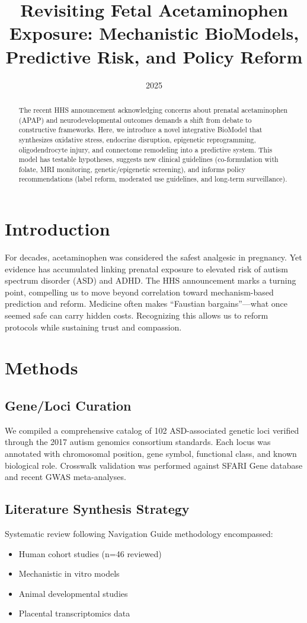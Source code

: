 \documentclass[12pt]{article}
\title{Revisiting Fetal Acetaminophen Exposure: Mechanistic BioModels, Predictive Risk, and Policy Reform}
\author{}
\date{2025}
\begin{document}
\maketitle

\begin{abstract}
The recent HHS announcement acknowledging concerns about prenatal acetaminophen (APAP) and neurodevelopmental outcomes demands a shift from debate to constructive frameworks. Here, we introduce a novel integrative BioModel that synthesizes oxidative stress, endocrine disruption, epigenetic reprogramming, oligodendrocyte injury, and connectome remodeling into a predictive system. This model has testable hypotheses, suggests new clinical guidelines (co-formulation with folate, MRI monitoring, genetic/epigenetic screening), and informs policy recommendations (label reform, moderated use guidelines, and long-term surveillance).
\end{abstract}

\section{Introduction}
For decades, acetaminophen was considered the safest analgesic in pregnancy. Yet evidence has accumulated linking prenatal exposure to elevated risk of autism spectrum disorder (ASD) and ADHD. The HHS announcement marks a turning point, compelling us to move beyond correlation toward mechanism-based prediction and reform. Medicine often makes ``Faustian bargains''---what once seemed safe can carry hidden costs. Recognizing this allows us to reform protocols while sustaining trust and compassion.

\section{Methods}

\subsection{Gene/Loci Curation}
We compiled a comprehensive catalog of 102 ASD-associated genetic loci verified through the 2017 autism genomics consortium standards. Each locus was annotated with chromosomal position, gene symbol, functional class, and known biological role. Crosswalk validation was performed against SFARI Gene database and recent GWAS meta-analyses.

\subsection{Literature Synthesis Strategy}
Systematic review following Navigation Guide methodology encompassed:
\begin{itemize}
    \item Human cohort studies (n=46 reviewed)
    \item Mechanistic in vitro models
    \item Animal developmental studies
    \item Placental transcriptomics data
\end{itemize}
\end{document}
